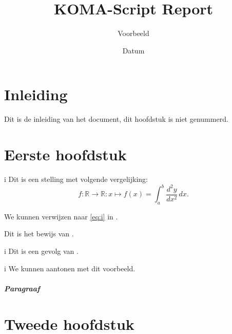 \documentclass[
    fontsize=10pt,
    twoside=false,
    usegeometry,
    autoenlargeheadfoot=false,
    toc=bibliography,
]{scrreprt}
\title{KOMA-Script Report}
\subtitle{Voorbeeld}
\date{Datum}
\begin{document}
    \maketitle
    \tableofcontents
    \chapter*{Inleiding}
    Dit is de inleiding van het document, dit hoofdstuk is niet genummerd.

    \chapter{Eerste hoofdstuk}
    \lipsum[1]
    \begin{stelling}{}{i}
        Dit is een stelling met volgende vergelijking:
        \begin{equation}\label{eq:i}
            f\colon \mathbb{R} \to \mathbb{R}\colon x \mapsto f(x) = \int_{a}^{b} \frac{d^2y}{dx^2}\,dx.
        \end{equation}
  \end{stelling}
  We kunnen verwijzen naar \cref{eq:i} in .
  \begin{bewijs}{}{}
      Dit is het bewijs van .
  \end{bewijs}
  \begin{gevolg}{}{i}
      Dit is een gevolg van .
  \end{gevolg}
  \begin{voorbeeld}{}{i}
      We kunnen  aantonen met dit voorbeeld.
  \end{voorbeeld}

  \paragraph{Paragraaf}
  \lipsum[2]
  \lipsum[3]

    \chapter{Tweede hoofdstuk}
    \lipsum
\end{document}
